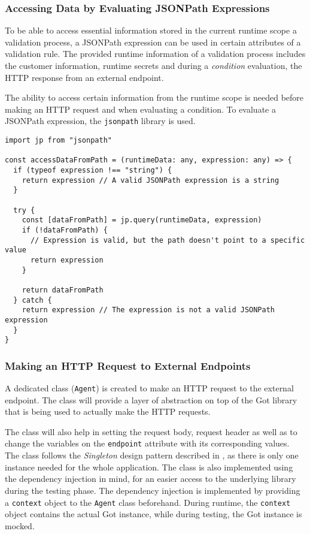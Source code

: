     \subsubsection{Accessing Data by Evaluating JSONPath Expressions}
      
      To be able to access essential information stored in the current runtime scope a validation process, a JSONPath expression can be used in certain attributes of a validation rule. The provided runtime information of a validation process includes the customer information, runtime secrets and during a \emph{condition} evaluation, the HTTP response from an external endpoint. 

      The ability to access certain information from the runtime scope is needed before making an HTTP request and when evaluating a condition. To evaluate a JSONPath expression, the \verb;jsonpath; library is used. 

      \begin{lstlisting}[style=es6, caption={Accessing runtime information using JSONPath expression (TypeScript)}]
import jp from "jsonpath"

const accessDataFromPath = (runtimeData: any, expression: any) => {
  if (typeof expression !== "string") {
    return expression // A valid JSONPath expression is a string
  }
  
  try {
    const [dataFromPath] = jp.query(runtimeData, expression)
    if (!dataFromPath) {
      // Expression is valid, but the path doesn't point to a specific value
      return expression 
    }

    return dataFromPath
  } catch {
    return expression // The expression is not a valid JSONPath expression
  }
}
\end{lstlisting}

    \subsubsection{Making an HTTP Request to External Endpoints}

      A dedicated class (\verb;Agent;) is created to make an HTTP request to the external endpoint. The class will provide a layer of abstraction on top of the Got library that is being used to actually make the HTTP requests. 
      
      The class will also help in setting the request body, request header as well as to change the variables on the \verb;endpoint; attribute with its corresponding values. The class follows the \emph{Singleton} design pattern described in \autocite[pp. 127-134]{gamma-1995}, as there is only one instance needed for the whole application. The class is also implemented using the dependency injection in mind, for an easier access to the underlying library during the testing phase. The dependency injection is implemented by providing a \verb;context; object to the \verb;Agent; class beforehand. During runtime, the \verb;context; object contains the actual Got instance, while during testing, the Got instance is mocked.

